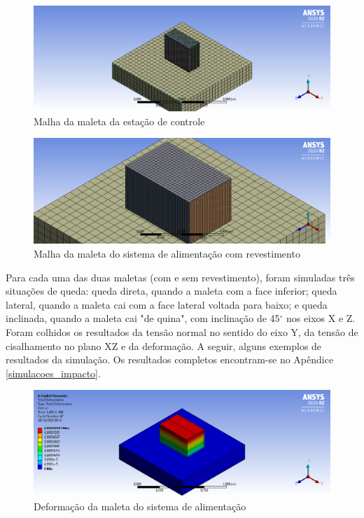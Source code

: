 \begin{figure}[H]
	\centering
		\includegraphics[width=1\textwidth]{figuras/estrutura_simulacaoImpacto/maletaMalha.png}
	\caption{Malha da maleta da estação de controle}
	\label{malha_maleta}
	\end{figure}

\begin{figure}[H]
	\centering
		\includegraphics[width=1\textwidth]{figuras/estrutura_simulacaoImpacto/ignicaoRevestidaMalha.png}
	\caption{Malha da maleta do sistema de alimentação com revestimento}
	\label{malha_igniçãoRevestida}
	\end{figure}

\par Para cada uma das duas maletas (com e sem revestimento), foram simuladas três situações de queda: queda direta, quando a maleta com a face inferior; queda lateral, quando a maleta cai com a face lateral voltada para baixo; e queda inclinada, quando a maleta cai "de quina", com inclinação de 45$^{\circ}$ nos eixos X e Z. Foram colhidos os resultados da tensão normal no sentido do eixo Y, da tensão de cisalhamento no plano XZ e da deformação. A seguir, alguns exemplos de resultados da simulação. Os resultados completos encontram-se no Apêndice \ref{simulacoes_impacto}.

\begin{figure}[H]
	\centering
		\includegraphics[width=1\textwidth]{figuras/estrutura_simulacaoImpacto/ignicaoDeformacaoLadoMaior.png}
	\caption{Deformação da maleta do sistema de alimentação}
	\label{deformacao_alimentacao1}
	\end{figure}

